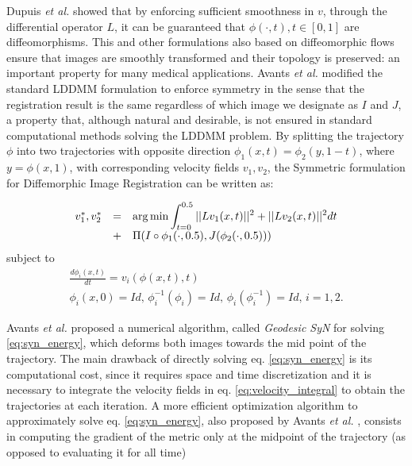 Dupuis {\it et al.} \cite{Dupuis1998} showed that by enforcing sufficient smoothness
in $v$, through the differential operator $L$, it can be guaranteed that $\phi(\cdot, t), t \in [0, 1]$ are diffeomorphisms. This and other formulations also based on
diffeomorphic flows ensure that images are smoothly transformed and their topology is preserved: an important property for many medical applications. Avants {\it et al.} \cite{Avants2008}
\cite{Avants2011} modified the standard LDDMM formulation to enforce symmetry in the sense that the registration result is the same regardless of which image we designate as $I$
and $J$, a property that, although natural and desirable, is not ensured in standard computational methods solving the LDDMM problem. By splitting the trajectory $\phi$ into two
trajectories with opposite direction $\phi_{1}(x, t) = \phi_{2}(y, 1-t)$, where $y = \phi(x, 1)$, with corresponding velocity fields $v_{1}, v_{2}$, the Symmetric formulation
for Diffemorphic Image Registration \cite{Avants2008}\cite{Avants2011} can be written as:

\begin{equation}\label{eq:syn_energy}
    \begin{array}{lll}
        v_{1}^{*}, v_{2}^{*} &=& \mathlarger{\arg \min \int_{t=0}^{0.5} ||L v_{1}(x, t)||^{2} + ||L v_{2}(x, t)||^{2} dt}\\
        &+& \mathlarger{ \Pi(I \circ \phi_{1}(\cdot, 0.5), J(\phi_{2}(\cdot, 0.5)))}
    \end{array}
\end{equation}
subject to
\begin{equation}\label{eq:syn_energy_constraints}
    \begin{array}{l}
        \frac{d\phi_{i}(x, t)}{dt} = v_{i}(\phi(x,t),t)\\
        \phi_{i}(x, 0) = Id,\, \phi_{i}^{-1}(\phi_{i}) = Id,\, \phi_{i}(\phi_{i}^{-1}) = Id,\, i=1,2.
    \end{array}
\end{equation}

Avants {\it et al.} \cite{Avants2006} proposed a numerical algorithm, called \textit{Geodesic SyN} for solving \eqref{eq:syn_energy}, which deforms both images towards the mid point of
the trajectory. The main drawback of directly solving eq. \eqref{eq:syn_energy} is its computational cost, since it requires space and time discretization and
it is necessary to integrate the velocity fields in eq. \eqref{eq:velocity_integral} to obtain the trajectories at each iteration. A more efficient optimization algorithm
to approximately solve eq. \eqref{eq:syn_energy}, also proposed by Avants {\it et al.} \cite{Avants2008}\cite{Avants2011}, consists in computing the gradient of the metric only at the
midpoint of the trajectory (as opposed to evaluating it for all time)

